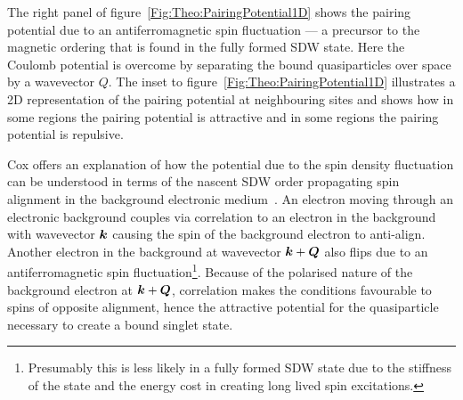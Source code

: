 The right panel of figure~\ref{Fig:Theo:PairingPotential1D} shows the pairing potential due to an antiferromagnetic spin fluctuation --- a precursor to the magnetic ordering that is found in the fully formed \ac{SDW} state. Here the Coulomb potential is overcome by separating the bound quasiparticles over space by a wavevector $Q$. The inset to figure~\ref{Fig:Theo:PairingPotential1D} illustrates a 2D representation of the pairing potential at neighbouring sites and shows how in some regions the pairing potential is attractive and in some regions the pairing potential is repulsive. 

Cox \etal{} offers an explanation of how the potential due to the spin density fluctuation can be understood in terms of the nascent \ac{SDW} order propagating spin alignment in the background electronic medium~\cite{Cox1995}. An electron moving through an electronic background couples via correlation to an electron in the background with wavevector $\boldsymbol{k}$ causing the spin of the background electron to anti-align. Another electron in the background at wavevector $\boldsymbol{k} + \boldsymbol{Q}$ also flips due to an antiferromagnetic spin fluctuation\footnote{Presumably this is less likely in a fully formed \ac{SDW} state due to the stiffness of the state and the energy cost in creating long lived spin excitations.}. Because of the polarised nature of the background electron at $\boldsymbol{k} + \boldsymbol{Q}$, correlation makes the conditions favourable to spins of opposite alignment, hence the attractive potential for the quasiparticle necessary to create a bound singlet state.

% 
% 
% 
% 

